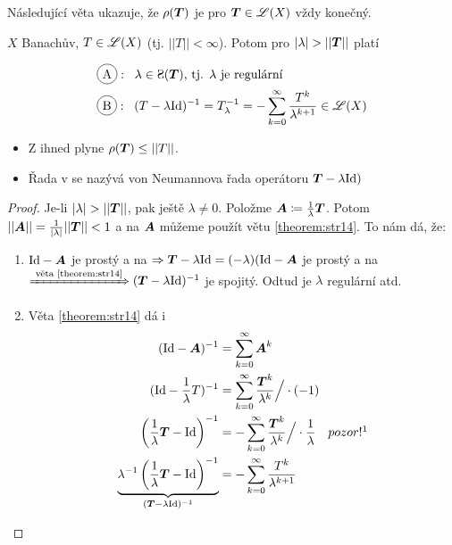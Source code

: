 Následující věta ukazuje, že $\rho(\boldsymbol{T})$ je pro $\boldsymbol{T} \in \mathscr{L}(X)$ vždy konečný.
\begin{theorem}
\label{theorem:str26}
    $X$ Banachův, $T\in \mathscr{L}(X)$ (tj. $||T||<\infty$). Potom pro $|\lambda|>||\map T||$ platí

\begin{align*}
        &\circled{A}:\;\; \lambda \in \Sp(\map T)\text{, tj. } \lambda \text{ je regulární}  \\
        &\circled{B}:\;\; (T-\lambda\Id)^{-1}=T_\lambda^{-1}=-\sum\limits_{k=0}^\infty\frac{T^k}{\lambda^{k+1}}\in\lin(X) 
\end{align*}
\end{theorem}

\begin{remark} 
\begin{itemize}
    \item Z  ihned plyne $\rho(\boldsymbol{T}) \leq ||T||$.
    \item Řada v  se nazývá von Neumannova řada operátoru $\boldsymbol{T}-\lambda \mathrm{Id})$
\end{itemize}
\end{remark}
\begin{proof}
    Je-li $|\lambda|>||\map T||$, pak ještě $\lambda\neq0$. Položme $\boldsymbol{A}\coloneqq\frac{1}{\lambda}\boldsymbol{T}$. Potom $||\boldsymbol{A}||=\frac{1}{|\lambda|}||\boldsymbol{T}||<1$ a na $\boldsymbol{A}$ můžeme použít větu \ref{theorem:str14}. To nám dá, že:
    \begin{enumerate}[label*=.]
        \item[\circled{A}] $\mathrm{Id}-\boldsymbol{A}$ je prostý a na $\Rightarrow \boldsymbol{T}-\lambda\mathrm{Id}=(-\lambda)(\mathrm{Id}-\boldsymbol{A}$ je prostý a na $\xRightarrow{\text{ věta \ref{theorem:str14}}} (\boldsymbol{T}-\lambda\mathrm{Id} )^{-1}$ je spojitý. Odtud je $\lambda$ regulární atd.
        \item[\circled{B}] Věta \ref{theorem:str14} dá i 
        \begin{align*}
            (\Id-\map A)^{-1}&=\sum_{k=0}^\infty \map A^k\\
            (\Id-\frac{1}{\lambda} T)^{-1}&=\sum_{k=0}^\infty\frac{\map T^k}{\lambda^k} \Big/ \cdot (-1)\\
            \left(\frac{1}{\lambda}\map T-\Id \right)^{-1}&=-\sum_{k=0}^\infty\frac{\map T^k}{\lambda^k} \Big/\cdot \frac{1}{\lambda} \quad pozor!\footnotemark\\
            \underbrace{\lambda^{-1}\left(\frac{1}{\lambda}\map T-\Id \right)^{-1}}_{(\map T-\lambda \Id)^{-1}}&=-\sum_{k=0}^\infty\frac{T^k}{\lambda^{k+1}}
        \end{align*}
      \end{enumerate}
\end{proof}

